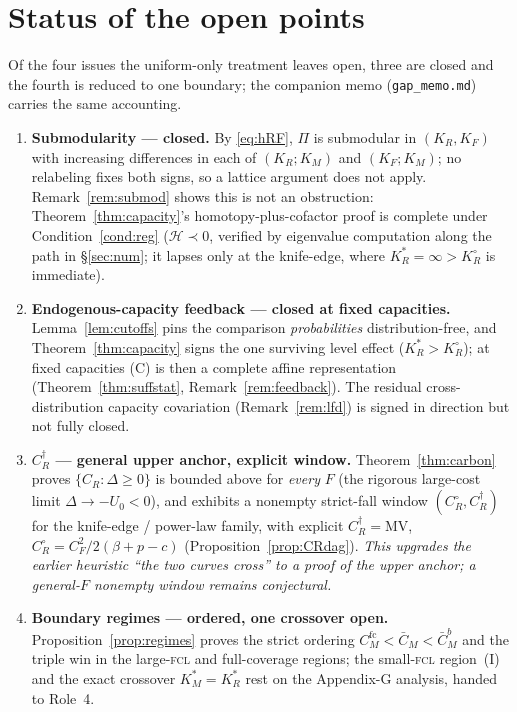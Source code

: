\documentclass[11pt,reqno]{amsart}
\theoremstyle{plain}
\theoremstyle{definition}
\theoremstyle{remark}
\newcommand{\KR}{K_R}
\newcommand{\KF}{K_F}
\newcommand{\KM}{K_M}
\newcommand{\KRs}{K_R^{*}}
\newcommand{\KMs}{K_M^{*}}
\newcommand{\KRo}{K_R^{\circ}}
\newcommand{\CM}{C_M}
\newcommand{\CF}{C_F}
\newcommand{\CR}{C_R}
\newcommand{\CMbar}{\bar C_M}
\newcommand{\bp}{\beta+p}
\begin{document}
\section{Status of the open points}\label{sec:gap}

Of the four issues the uniform-only treatment leaves open, three are closed and
the fourth is reduced to one boundary; the companion memo
(\texttt{gap\_memo.md}) carries the same accounting.
\begin{enumerate}[leftmargin=1.7em]
  \item \textbf{Submodularity --- closed.} By \eqref{eq:hRF}, $\Pi$ is
        submodular in $(\KR,\KF)$ with increasing differences in each of
        $(\KR;\KM)$ and $(\KF;\KM)$; no relabeling fixes both signs, so a lattice
        argument does not apply. Remark~\ref{rem:submod} shows this is not an
        obstruction: Theorem~\ref{thm:capacity}'s homotopy-plus-cofactor proof is
        complete under Condition~\ref{cond:reg} ($\mathcal H\prec0$, verified by
        eigenvalue computation along the path in \S\ref{sec:num}; it lapses only at
        the knife-edge, where $\KRs=\infty>\KRo$ is immediate).
  \item \textbf{Endogenous-capacity feedback --- closed at fixed capacities.}
        Lemma~\ref{lem:cutoffs} pins the comparison \emph{probabilities}
        distribution-free, and Theorem~\ref{thm:capacity} signs the one surviving
        level effect ($\KRs>\KRo$); at fixed capacities (C) is then a complete
        affine representation (Theorem~\ref{thm:suffstat}, Remark~\ref{rem:feedback}).
        The residual cross-distribution capacity covariation (Remark~\ref{rem:lfd})
        is signed in direction but not fully closed.
  \item \textbf{$\CR^{\dagger}$ --- general upper anchor, explicit window.}
        Theorem~\ref{thm:carbon} proves $\{\CR:\Delta\ge0\}$ is bounded above for
        \emph{every} $F$ (the rigorous large-cost limit $\Delta\to-U_0<0$), and
        exhibits a nonempty strict-fall window $(\CR^{\circ},\CR^{\dagger})$ for the
        knife-edge / power-law family, with explicit
        $\CR^{\dagger}=\mathrm{MV}$, $\CR^{\circ}=\CF^2/2(\bp-c)$
        (Proposition~\ref{prop:CRdag}). \emph{This upgrades the earlier heuristic
        ``the two curves cross'' to a proof of the upper anchor; a general-$F$
        nonempty window remains conjectural.}
  \item \textbf{Boundary regimes --- ordered, one crossover open.}
        Proposition~\ref{prop:regimes} proves the strict ordering
        $\CM^{\mathrm{fc}}<\CMbar<\CMbar^{b}$ and the triple win in the large-\textsc{fcl}
        and full-coverage regions; the small-\textsc{fcl} region~(I) and the exact
        crossover $\KMs=\KRs$ rest on the Appendix-G analysis, handed to Role~4.
\end{enumerate}
\end{document}
